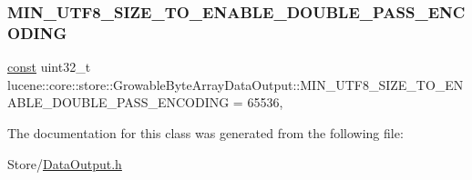 \subsubsection{\texorpdfstring{M\+I\+N\+\_\+\+U\+T\+F8\+\_\+\+S\+I\+Z\+E\+\_\+\+T\+O\+\_\+\+E\+N\+A\+B\+L\+E\+\_\+\+D\+O\+U\+B\+L\+E\+\_\+\+P\+A\+S\+S\+\_\+\+E\+N\+C\+O\+D\+I\+NG}{MIN\_UTF8\_SIZE\_TO\_ENABLE\_DOUBLE\_PASS\_ENCODING}}
{\footnotesize\ttfamily \mbox{\hyperlink{ZlibCrc32_8h_a2c212835823e3c54a8ab6d95c652660e}{const}} uint32\+\_\+t lucene\+::core\+::store\+::\+Growable\+Byte\+Array\+Data\+Output\+::\+M\+I\+N\+\_\+\+U\+T\+F8\+\_\+\+S\+I\+Z\+E\+\_\+\+T\+O\+\_\+\+E\+N\+A\+B\+L\+E\+\_\+\+D\+O\+U\+B\+L\+E\+\_\+\+P\+A\+S\+S\+\_\+\+E\+N\+C\+O\+D\+I\+NG = 65536\hspace{0.3cm}{\ttfamily [static]}, {\ttfamily [private]}}



The documentation for this class was generated from the following file\+:\begin{DoxyCompactItemize}
\item 
Store/\mbox{\hyperlink{DataOutput_8h}{Data\+Output.\+h}}\end{DoxyCompactItemize}
